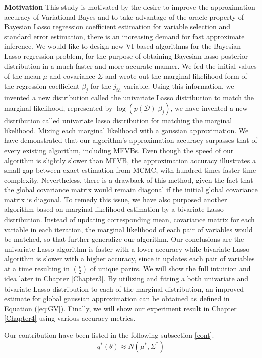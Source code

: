 \textbf{Motivation}
This study is motivated by the desire to improve the approximation accuracy of Variational Bayes and to take advantage of the oracle property of Bayesian Lasso regression coefficient estimation for variable selection and standard error estimation, there is an increasing demand for fast approximate inference. We would like to design new VI based algorithms for the Bayesian Lasso regression problem, for the purpose of obtaining Bayesian lasso posterior distribution in a much faster and more accurate manner.
We fed the initial values of the mean $\mu$ and covariance $\Sigma$ and wrote out the marginal likelihood form of the regression coefficient $\beta_j$ for the $j_{th}$ variable. Using this information, we invented a new distribution called the univariate Lasso distribution to match the marginal likelihood, represented by $\log(p(\mathcal{D})|\beta_j)$, we have invented a new distribution called univariate lasso distribution for matching the marginal likelihood. Mixing each marginal likelihood with a gaussian approximation. We have demonstrated that our algorithm's approximation accuracy surpasses that of every existing algorithm, including MFVBs. Even though the speed of our algorithm is slightly slower than MFVB, the approximation accuracy illustrates a small gap between exact estimation from MCMC, with hundred times faster time complexity. Nevertheless, there is a drawback of this method, given the fact that the global covariance matrix would remain diagonal if the initial global covariance matrix is diagonal.
To remedy this issue, we have also purposed another algorithm based on marginal likelihood estimation by a bivariate Lasso distribution. Instead of updating corresponding mean, covariance matrix for each variable in each iteration, the marginal likelihood of each pair of variables would be matched, so that further generalize our algorithm. Our conclusions are the univariate Lasso algorithm is faster with a lower accuracy while bivariate Lasso algorithm is slower with a higher accuracy, since it updates each pair of variables at a time resulting in ${p\choose 2}$ of unique parirs. We will show the full intuition and idea later in Chapter \ref{Chapter3}.
By utilizing and fitting a both univariate and bivariate Lasso distribution to each of the marginal distribution, an improved estimate for global gaussian approximation can be obtained as defined in Equation (\ref{eq:GV}). Finally, we will show our experiment result in Chapter \ref{Chapter4} using various accuracy metrics.

Our contribution have been listed in the following subsection \ref{cont}.
\begin{equation}
	\label{eq:GV}
	q^{*}(\theta) \approx N(\mu^*,\Sigma^*)
\end{equation}

